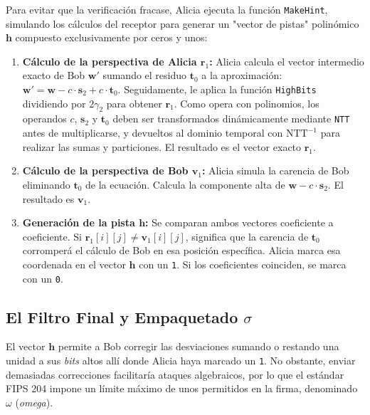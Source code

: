 \documentclass[11pt, a4paper]{report}
\theoremstyle{definition}
\begin{document}
Para evitar que la verificación fracase, Alicia ejecuta la función \texttt{MakeHint}, simulando los cálculos del receptor para generar un "vector de pistas" polinómico $\mathbf{h}$ compuesto exclusivamente por ceros y unos:

\begin{enumerate}
    \item \textbf{Cálculo de la perspectiva de Alicia $\mathbf{r}_1$:} Alicia calcula el vector intermedio exacto de Bob $\mathbf{w}'$ sumando el residuo $\mathbf{t}_0$ a la aproximación: $\mathbf{w}' = \mathbf{w} - c \cdot \mathbf{s}_2 + c \cdot \mathbf{t}_0$. Seguidamente, le aplica la función \texttt{HighBits} dividiendo por $2\gamma_2$ para obtener $\mathbf{r}_1$. Como opera con polinomios, los operandos $c$, $\mathbf{s}_2$ y $\mathbf{t}_0$ deben ser transformados dinámicamente mediante \texttt{NTT} antes de multiplicarse, y devueltos al dominio temporal con $\text{NTT}^{-1}$ para realizar las sumas y particiones. El resultado es el vector exacto $\mathbf{r}_1$.
    \item \textbf{Cálculo de la perspectiva de Bob $\mathbf{v}_1$:} Alicia simula la carencia de Bob eliminando $\mathbf{t}_0$ de la ecuación. Calcula la componente alta de $\mathbf{w} - c \cdot \mathbf{s}_2$. El resultado es $\mathbf{v}_1$.
    \item \textbf{Generación de la pista $\mathbf{h}$:} Se comparan ambos vectores coeficiente a coeficiente. Si $\mathbf{r}_1[i][j] \neq \mathbf{v}_1[i][j]$, significa que la carencia de $\mathbf{t}_0$ corromperá el cálculo de Bob en esa posición específica. Alicia marca esa coordenada en el vector $\mathbf{h}$ con un \texttt{1}. Si los coeficientes coinciden, se marca con un \texttt{0}.
\end{enumerate}

\subsection{El Filtro Final y Empaquetado $\sigma$}

El vector $\mathbf{h}$ permite a Bob corregir las desviaciones sumando o restando una unidad a sus \textit{bits} altos allí donde Alicia haya marcado un \texttt{1}. No obstante, enviar demasiadas correcciones facilitaría ataques algebraicos, por lo que el estándar FIPS 204 impone un límite máximo de unos permitidos en la firma, denominado $\omega$ (\textit{omega}).

\begin{table}[H]
    \centering
    \renewcommand{\arraystretch}{1.3}
    \caption{Número máximo de correcciones permitidas en el vector $\mathbf{h}$.}
    \label{tab:limite_omega}
\end{table}
\end{document}
